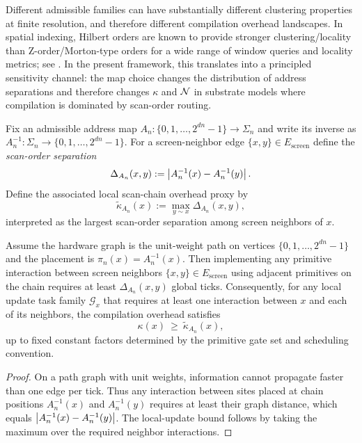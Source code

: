 \begin{remark}
\label{rem:hilbert_vs_zorder}
Different admissible families can have substantially different clustering properties at finite resolution, and therefore different compilation overhead landscapes.
In spatial indexing, Hilbert orders are known to provide stronger clustering/locality than Z-order/Morton-type orders for a wide range of window queries and locality metrics; see \cite{MoonJagadishFaloutsosSaltz2001}.
In the present framework, this translates into a principled sensitivity channel: the map choice changes the distribution of address separations and therefore changes $\kappa$ and $\mathcal{N}$ in substrate models where compilation is dominated by scan-order routing.
\end{remark}

\begin{definition}
\label{def:neighbor_index_separation}
Fix an admissible address map $A_n:\{0,1,\dots,2^{dn}-1\}\to\Sigma_n$ and write its inverse as $A_n^{-1}:\Sigma_n\to\{0,1,\dots,2^{dn}-1\}$.
For a screen-neighbor edge $\{x,y\}\in E_{\mathrm{screen}}$ define the \emph{scan-order separation}
\[
\Delta_{A_n}(x,y):=\left\lvert A_n^{-1}(x)-A_n^{-1}(y)\right\rvert.
\]
Define the associated local scan-chain overhead proxy by
\[
\widetilde\kappa_{A_n}(x):=\max_{y\sim x}\Delta_{A_n}(x,y),
\]
interpreted as the largest scan-order separation among screen neighbors of $x$.
\end{definition}

\begin{proposition}
\label{prop:scan_chain_separation_lower_bound}
Assume the hardware graph is the unit-weight path on vertices $\{0,1,\dots,2^{dn}-1\}$ and the placement is $\pi_n(x)=A_n^{-1}(x)$.
Then implementing any primitive interaction between screen neighbors $\{x,y\}\in E_{\mathrm{screen}}$ using adjacent primitives on the chain requires at least $\Delta_{A_n}(x,y)$ global ticks.
Consequently, for any local update task family $\mathcal{G}_x$ that requires at least one interaction between $x$ and each of its neighbors, the compilation overhead satisfies
\[
\kappa(x)\ \ge\ \widetilde\kappa_{A_n}(x),
\]
up to fixed constant factors determined by the primitive gate set and scheduling convention.
\end{proposition}

\begin{proof}
On a path graph with unit weights, information cannot propagate faster than one edge per tick.
Thus any interaction between sites placed at chain positions $A_n^{-1}(x)$ and $A_n^{-1}(y)$ requires at least their graph distance, which equals $\left\lvert A_n^{-1}(x)-A_n^{-1}(y)\right\rvert$.
The local-update bound follows by taking the maximum over the required neighbor interactions.
\end{proof}

